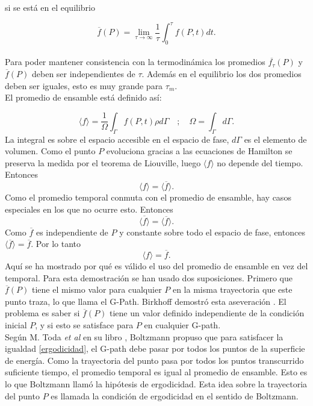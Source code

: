 si se está en el equilibrio

\begin{equation}
\overline{f}(P)= \lim_{\tau \to \infty} \frac{1}{\tau} \int_{0}^{\tau} f(P,t) dt.
\end{equation}
\\
Para poder mantener consistencia con la termodinámica los promedios $\overline{f_{\tau}}(P)$ y  $\overline{f}(P)$ deben ser independientes de $\tau$. Además en el equilibrio los dos promedios deben ser iguales, esto es muy grande para $\tau_{m}$. \\
El promedio de ensamble está definido así:

\begin{equation}
\langle f \rangle = \frac{1}{\Omega} \int_{\Gamma} f(P,t) \rho d\Gamma \quad ; \quad \Omega= \int_{\Gamma} d\Gamma.
\end{equation}
La integral es sobre el espacio accesible en el espacio de fase, $d\Gamma$ es el elemento de volumen. Como el punto $P$ evoluciona gracias a las ecuaciones de Hamilton se preserva la medida por el teorema de Liouville, luego $\langle f \rangle$ no depende del tiempo. Entonces 
\begin{equation}
\langle f \rangle =  \overline{\langle f \rangle}.
\end{equation}
Como el promedio temporal conmuta con el promedio de ensamble, hay casos especiales en los que no ocurre esto. Entonces
\begin{equation}
\overline{\langle f \rangle} = \langle \overline{f} \rangle.
\end{equation}
Como $\overline{f}$ es independiente de $P$ y constante sobre todo el espacio de fase, entonces $\langle \overline{f} \rangle= \overline{f}$. Por lo tanto
\begin{equation} \label{ergodicidad}
\langle f \rangle = \overline{f}.
\end{equation}
Aquí se ha mostrado por qué es válido el uso del promedio de ensamble en vez del temporal. Para esta demostración se han usado dos suposiciones. Primero que  $\overline{f}(P)$ tiene el mismo valor para cualquier $P$ en la misma trayectoria que este punto traza, lo que \cite{Ehrenfest} llama el G-Path. Birkhoff demostró esta aseveración \cite{Birkhoff}. El problema es saber si $\overline{f}(P)$  tiene un valor definido independiente de la condición inicial $P$, y si esto se satisface para $P$ en cualquier G-path. \\
Según M. Toda \textit{et al} en su libro \cite{TodaStat}, Boltzmann propuso que para satisfacer la igualdad \ref{ergodicidad}, el G-path debe pasar por todos los puntos de la superficie de energía. Como la trayectoria del punto pasa por todos los puntos transcurrido suficiente tiempo, el promedio temporal es igual al promedio de ensamble. Esto es lo que Boltzmann llamó la hipótesis de ergodicidad. Esta idea sobre la trayectoria del punto $P$ es llamada la condición de ergodicidad en el sentido de Boltzmann.
